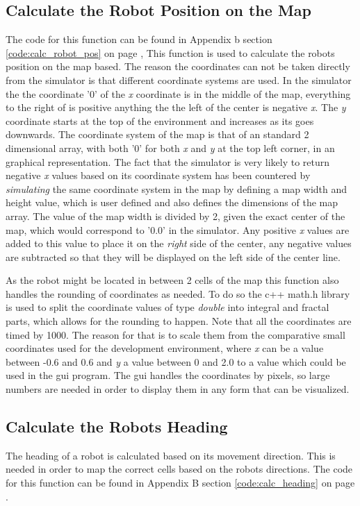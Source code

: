 \subsection{Calculate the Robot Position on the Map}
\label{chap3:calc_robot_pos}
The code for this function can be found in Appendix b section \ref{code:calc_robot_pos} on page \pageref{code:calc_robot_pos}, 
This function is used to calculate the robots position on the map based.
The reason the coordinates can not be taken directly from the simulator is that different coordinate systems are used. In the simulator the the coordinate '0' of the \textit{x} coordinate is in the middle of the map, everything to the right of is positive anything the the left of the center is negative \textit{x}. The \textit{y} coordinate starts at the top of the environment and increases as its goes downwards. 
The coordinate system of the map is that of an standard 2 dimensional array, with both '0' for both \textit{x} and \textit{y} at the top left corner, in an graphical representation. 
The fact that the simulator is very likely to return negative \textit{x} values based on its coordinate system has been countered by \textit{simulating} the same coordinate system in the map by defining a map width and height value, which is user defined and also defines the dimensions of the map array.
The value of the map width is divided by 2, given the exact center of the map, which would correspond to '0.0' in the simulator. Any positive \textit{x} values are added to this value to place it on the \textit{right} side of the center, any negative values are subtracted so that they will be displayed on the left side of the center line. 

As the robot might be located in between 2 cells of the map this function also handles the rounding of coordinates as needed. To do so the c++ math.h library is used to split the coordinate values of type \textit{double} into integral and fractal parts, which allows for the rounding to happen. 
Note that all the coordinates are timed by 1000. The reason for that is to scale them from the comparative small coordinates used for the development environment, where \textit{x} can be a value between -0.6 and 0.6 and \textit{y} a value between 0 and 2.0 to a value which could be used in the gui program. The gui handles the coordinates by pixels, so large numbers are needed in order to display them in any form that can be visualized.\\

\subsection{Calculate the Robots Heading}
\label{chap3:calc_heading}
The heading of a robot is calculated based on its movement direction. 
This is needed in order to map the correct cells based on the robots directions. 
The code for this function can be found in Appendix B section \ref{code:calc_heading} on page \pageref{code:calc_heading}.\\

